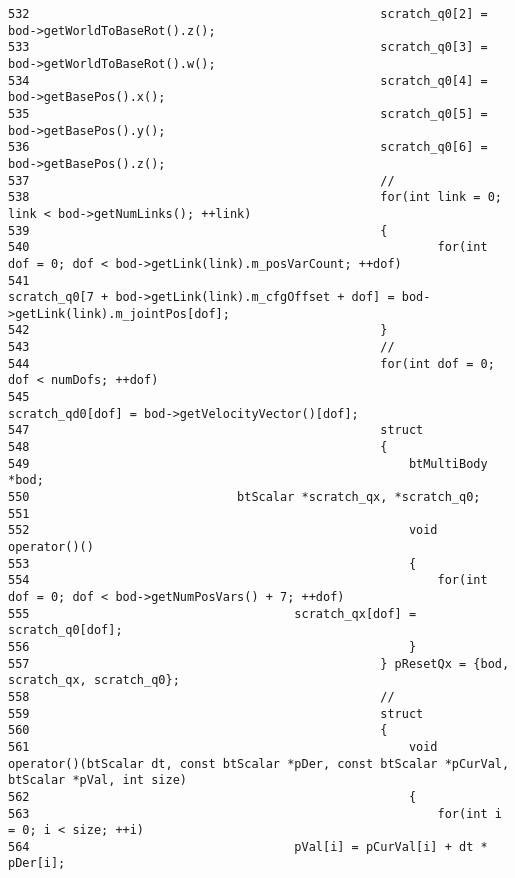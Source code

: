 \begin{Code}
\begin{verbatim}
532                                                 scratch_q0[2] = bod->getWorldToBaseRot().z();
533                                                 scratch_q0[3] = bod->getWorldToBaseRot().w();
534                                                 scratch_q0[4] = bod->getBasePos().x();
535                                                 scratch_q0[5] = bod->getBasePos().y();
536                                                 scratch_q0[6] = bod->getBasePos().z();
537                                                 //
538                                                 for(int link = 0; link < bod->getNumLinks(); ++link)
539                                                 {
540                                                         for(int dof = 0; dof < bod->getLink(link).m_posVarCount; ++dof)
541                                                                 scratch_q0[7 + bod->getLink(link).m_cfgOffset + dof] = bod->getLink(link).m_jointPos[dof];                                                      
542                                                 }
543                                                 //
544                                                 for(int dof = 0; dof < numDofs; ++dof)                                                          
545                                                         scratch_qd0[dof] = bod->getVelocityVector()[dof];
547                                                 struct
548                                                 {
549                                                     btMultiBody *bod;
550                             btScalar *scratch_qx, *scratch_q0;
551 
552                                                     void operator()()
553                                                     {
554                                                         for(int dof = 0; dof < bod->getNumPosVars() + 7; ++dof)
555                                     scratch_qx[dof] = scratch_q0[dof];
556                                                     }
557                                                 } pResetQx = {bod, scratch_qx, scratch_q0};
558                                                 //
559                                                 struct
560                                                 {
561                                                     void operator()(btScalar dt, const btScalar *pDer, const btScalar *pCurVal, btScalar *pVal, int size)
562                                                     {
563                                                         for(int i = 0; i < size; ++i)
564                                     pVal[i] = pCurVal[i] + dt * pDer[i];

\end{verbatim}
\end{Code}
